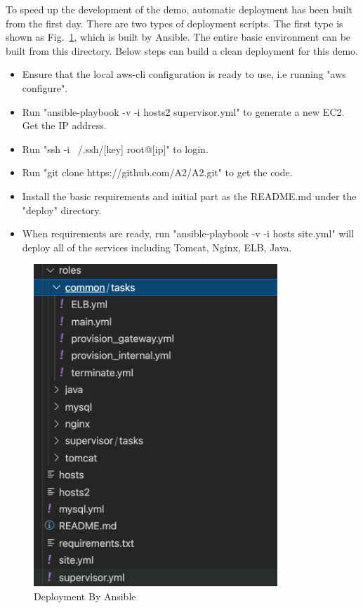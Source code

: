 \documentclass[conference]{IEEEtran}
\begin{document}
To speed up the development of the demo, automatic deployment has been built from the first day. There are two types of deployment scripts. The first type is shown 
as Fig.~\ref{ansible}, which is built by Ansible. The entire basic environment can be built from this directory. Below steps can build a clean deployment for this demo.

\begin{itemize}
    \item Ensure that the local aws-cli configuration is ready to use, i.e running "aws configure".
    \item Run "ansible-playbook -v -i hosts2 supervisor.yml" to generate a new EC2. Get the IP address.
    \item Run "ssh -i ~/.ssh/[key] root@[ip]" to login.
    \item Run "git clone https://github.com/A2/A2.git" to get the code.
    \item Install the basic requirements and initial part as the README.md under the "deploy" directory.
    \item When requirements are ready, run "ansible-playbook -v -i hosts site.yml" will deploy all of the services including Tomcat, Nginx, ELB, Java. 
\end{itemize}

\begin{figure}[htbp]
    \centerline{\includegraphics[width=260pt]{images/ansible.png}}
    \caption{Deployment By Ansible}
    \label{ansible}
\end{figure}
\end{document}
